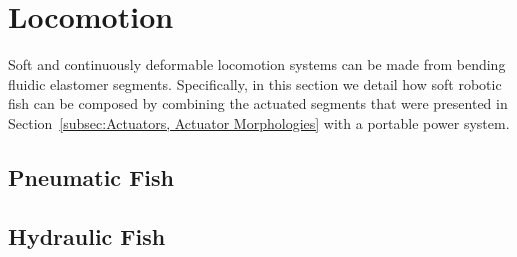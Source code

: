 \section{Locomotion}
\label{sec:Locomotion}
Soft and continuously deformable locomotion systems can be made from bending fluidic elastomer segments.
Specifically, in this section we detail how soft robotic fish can be composed by combining the actuated segments that were presented in Section~\ref{subsec:Actuators, Actuator Morphologies} with a portable power system.

\subsection{Pneumatic Fish}
\label{subsec:Locomotion, Pneumatic Fish}


\subsection{Hydraulic Fish}
\label{subsec:Locomotion, Hydraulic Fish}

